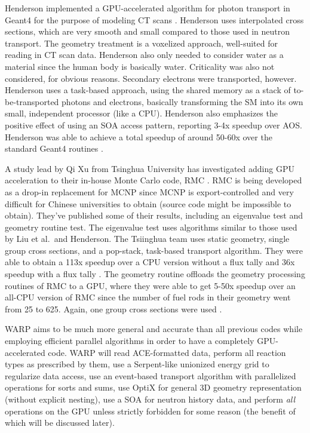 Henderson implemented a GPU-accelerated algorithm for photon transport in Geant4 for the purpose of modeling CT scans \cite{henderson}.   Henderson uses interpolated cross sections, which are very smooth and small compared to those used in neutron transport.  The geometry treatment is a voxelized approach, well-suited for reading in CT scan data.  Henderson also only needed to consider water as a material since the human body is basically water.  Criticality was also not considered, for obvious reasons. Secondary electrons were transported, however. Henderson uses a task-based approach, using the shared memory as a stack of to-be-transported photons and electrons, basically transforming the SM %
 into its own small, independent processor (like a CPU).  Henderson also emphasizes the positive effect of using an SOA access pattern, reporting 3-4x speedup over AOS.  Henderson was able to achieve a total speedup of around 50-60x over the standard Geant4 routines \cite{henderson}.

A study lead by Qi Xu from Tsinghua University has investigated adding GPU acceleration to their in-house Monte Carlo code, RMC \cite{qixu}. RMC is being developed as a drop-in replacement for MCNP since MCNP is export-controlled and very difficult for Chinese universities to obtain (source code might be impossible to obtain).  They've published some of their results, including an eigenvalue test and geometry routine test.  The eigenvalue test uses algorithms similar to those used by Liu et al.\ and Henderson.  The Tsiinghua team uses static geometry, single group cross sections, and a pop-stack, task-based transport algorithm.  They were able to obtain a 113x speedup over a CPU version without a flux tally and 36x speedup with a flux tally \cite{qixu_ans_winter}.  The geometry routine offloads the geometry processing routines of RMC to a GPU, where they were able to get 5-50x speedup over an all-CPU version of RMC since the number of fuel rods in their geometry went from 25 to 625.%
  Again, one group cross sections were used \cite{qixu}.

WARP aims to be much more general and accurate than all previous codes while employing efficient parallel algorithms in order to have a completely GPU-accelerated code.  WARP will read ACE-formatted data, perform all reaction types as prescribed by them, use a Serpent-like unionized energy grid to regularize data access, use an event-based transport algorithm with parallelized operations for sorts and sums, use OptiX for general 3D geometry representation (without explicit nesting), use a SOA for neutron history data, and perform \emph{all} operations on the GPU unless strictly forbidden for some reason (the benefit of which will be discussed later).%
	

